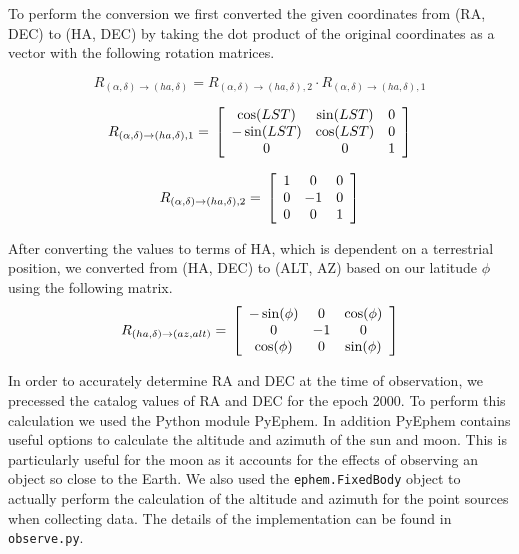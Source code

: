 \documentclass{article}
\begin{document}
  To perform the conversion we first converted the given coordinates from
  (RA, DEC) to (HA, DEC) by taking the dot product of the original coordinates
  as a vector with the following rotation matrices.

   \[ {R}_{(\alpha , \delta ) \rightarrow (ha, \delta )} =
      {R}_{(\alpha , \delta) \rightarrow (ha, \delta ),2} \cdot
      {R}_{(\alpha , \delta ) \rightarrow (ha, \delta ),1} \]

   \[ {R}_{(\alpha , \delta ) \rightarrow (ha, \delta ),1} = \\
       \left [ \begin{array}{ccc}
           \cos(LST) & \sin(LST) & 0 \\
           -\sin(LST) & \cos(LST) & 0 \\
           0 & 0 & 1 \\
       \end{array} \right ]  \]

   \[ {R}_{(\alpha , \delta ) \rightarrow (ha, \delta ),2} = \\
       \left [ \begin{array}{ccc}
           1 & 0 & 0 \\
           0 & -1 & 0 \\
           0 & 0 & 1 \\
       \end{array} \right ]  \]

  After converting the values to terms of HA, which is dependent on a
  terrestrial position, we converted from (HA, DEC) to (ALT, AZ) based on our
  latitude $\phi$ using the following matrix.
   \[ {R}_{(ha , \delta ) \rightarrow (az, alt)} = \\
       \left [ \begin{array}{ccc}
           -\sin(\phi) & 0 & \cos(\phi) \\
           0 & -1 & 0 \\
           \cos(\phi) & 0 & \sin(\phi) \\
       \end{array} \right ]  \]

  In order to accurately determine RA and DEC at the time of observation, we
  precessed the catalog values of RA and DEC for the epoch 2000. To perform this
  calculation we used the Python module PyEphem. In addition PyEphem
  contains useful options to calculate the altitude and azimuth of the sun and
  moon. This is particularly useful for the moon as it accounts for the effects
  of observing an object so close to the Earth. We also used the
  \lstinline{ephem.FixedBody} object to actually perform the calculation of
  the altitude and azimuth for the point sources when collecting data. The
  details of the implementation can be found in \lstinline{observe.py}.
\end{document}
